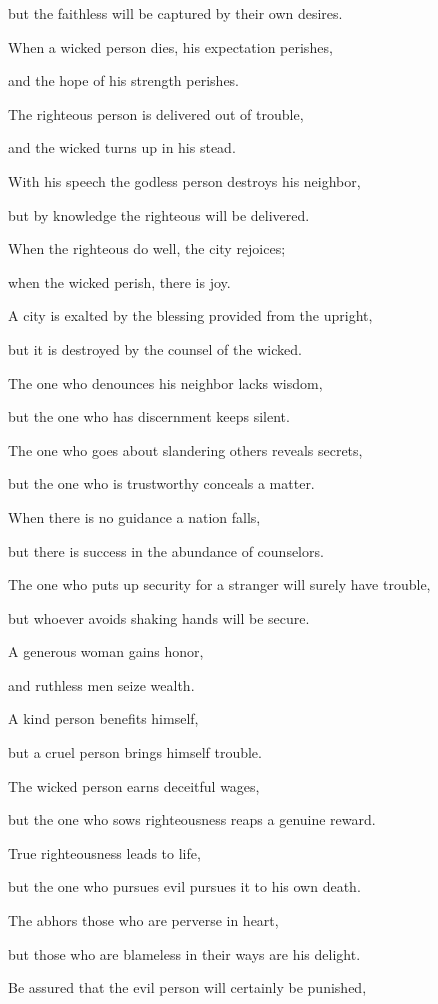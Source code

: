 {\par }{\Q but the faithless
will be captured
by their own desires.
\par }{\Q {}When a wicked
person
dies,
his expectation
perishes,
\par }{\Q and the hope
of his strength
perishes.
\par }{\Q {}The righteous
person is delivered
out of trouble,
\par }{\Q and the wicked
turns up
in his stead.
\par }{\Q {}With his speech the godless
person destroys
his neighbor,
\par }{\Q but by knowledge
the righteous
will be delivered.
\par }{\Q {}When the righteous
do well,
the city
rejoices;
\par }{\Q when the wicked
perish,
there is joy.
\par }{\Q {}A city is exalted
by the blessing
provided
from the upright,
\par }{\Q but it is destroyed
by the counsel
of the wicked.
\par }{\Q {}The one who denounces
his neighbor
lacks
wisdom,
\par }{\Q but the one
who has discernment
keeps silent.
\par }{\Q {}The one who goes
about slandering
others reveals
secrets,
\par }{\Q but the one
who is trustworthy
conceals
a matter.
\par }{\Q {}When there is no
guidance
a nation
falls,
\par }{\Q but there is success
in the abundance
of counselors.
\par }{\Q {}The one who puts up security
for
a stranger
will surely have trouble,
\par }{\Q but
whoever avoids
shaking hands will be secure.
\par }{\Q {}A generous
woman
gains
honor,
\par }{\Q and ruthless
men seize
wealth.
\par }{\Q {}A kind
person
benefits
himself,
\par }{\Q but a cruel
person brings himself
trouble.
\par }{\Q {}The wicked
person earns
deceitful
wages,

\par }{\Q but the one who sows
righteousness
reaps a genuine
reward.
\par }{\Q {}True
righteousness
leads to life,
\par }{\Q but the one who pursues
evil
pursues it to his own death.
\par }{\Q {}The
{}
abhors
those who are perverse
in heart,
\par }{\Q but those who are blameless
in their ways
are his delight.
\par }{\Q {}Be assured
that the evil
person will certainly be punished,

}
